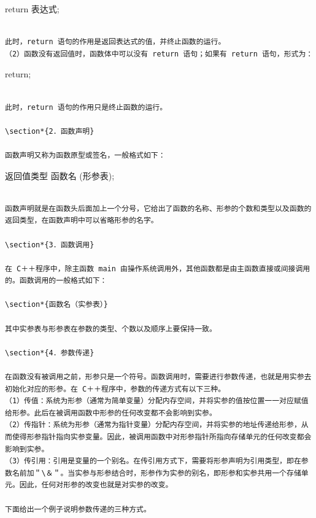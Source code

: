 \documentclass[10pt]{article}
\begin{document}
return 表达式;

\begin{verbatim}

此时，return 语句的作用是返回表达式的值，并终止函数的运行。
（2）函数没有返回值时，函数体中可以没有 return 语句；如果有 return 语句，形式为：
\end{verbatim}

return;

\begin{verbatim}

此时，return 语句的作用只是终止函数的运行。

\section*{2．函数声明}

函数声明又称为函数原型或签名，一般格式如下：
\end{verbatim}

返回值类型 函数名 (形参表);

\begin{verbatim}

函数声明就是在函数头后面加上一个分号，它给出了函数的名称、形参的个数和类型以及函数的返回类型，在函数声明中可以省略形参的名字。

\section*{3．函数调用}

在 C＋＋程序中，除主函数 main 由操作系统调用外，其他函数都是由主函数直接或间接调用的。函数调用的一般格式如下：

\section*{函数名（实参表）}

其中实参表与形参表在参数的类型、个数以及顺序上要保持一致。

\section*{4．参数传递}

在函数没有被调用之前，形参只是一个符号。函数调用时，需要进行参数传递，也就是用实参去初始化对应的形参。在 C＋＋程序中，参数的传递方式有以下三种。
（1）传值：系统为形参（通常为简单变量）分配内存空间，并将实参的值按位置一一对应赋值给形参。此后在被调用函数中形参的任何改变都不会影响到实参。
（2）传指针：系统为形参（通常为指针变量）分配内存空间，并将实参的地址传递给形参，从而使得形参指针指向实参变量。因此，被调用函数中对形参指针所指向存储单元的任何改变都会影响到实参。
（3）传引用：引用是变量的一个别名。在传引用方式下，需要将形参声明为引用类型，即在参数名前加＂\＆＂。当实参与形参结合时，形参作为实参的别名，即形参和实参共用一个存储单元。因此，任何对形参的改变也就是对实参的改变。

下面给出一个例子说明参数传递的三种方式。
\end{verbatim}
\end{document}
